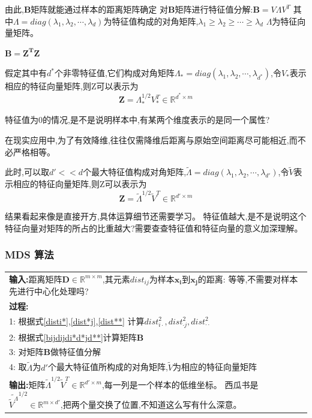 \documentclass[UTF8,a4paper]{ctexart}%
\begin{document}
              由此,$\mathbf{B}$矩阵就能通过样本的距离矩阵确定
              对$\mathbf{B}$矩阵进行特征值分解:$\mathbf{B} = V\Lambda V^T$
              其中$\Lambda = diag(\lambda_1,\lambda_2,\cdots,\lambda_d)$为特征值构成的对角矩阵,$\lambda_1\geqslant \lambda_2\geqslant\cdots\geqslant\lambda_d$
              $\Lambda$为特征向量矩阵。

              $\mathbf{\mathbf{B}} = \mathbf{Z^TZ}$

              假定其中有$d^*$个非零特征值,它们构成对角矩阵$\Lambda_* = diag(\lambda_1,\lambda_2,\cdots,\lambda_{d^*})$,令$V_*$表示相应的特征向量矩阵,则Z可以表示为
              \[ \mathbf{Z} =\Lambda_*^{1/2}V_*^T \in \mathbb{R}^{d^* \times m}  \]

              {
              \color{red} 特征值为0的情况,是不是说明样本中,有某两个维度表示的是同一个属性?
              }

              在现实应用中,为了有效降维,往往仅需降维后距离与原始空间距离尽可能相近,而不必严格相等。

              此时,可以取$d' << d$个最大特征值构成对角矩阵,$\tilde{\Lambda } = diag(\lambda_1,\lambda_2,\cdots,\lambda_{d'} )$,令$\tilde{V}$表示相应的特征向量矩阵,则Z可以表示为
                \[ \mathbf{Z} =\tilde{\Lambda}^{1/2}\tilde{V}^T \in \mathbb{R}^{d' \times m}  \]

                {\color{red}
                    结果看起来像是直接开方,具体运算细节还需要学习。
                }
                {\color{red}
                  特征值越大,是不是说明这个特征向量对矩阵的所占的比重越大?需要查查特征值和特征向量的意义加深理解。
                }

            \subsubsection{MDS 算法}
            \begin{tabular}{l}
              \hline
              \textbf{输入:}距离矩阵$\mathbf{D} \in \mathbb{R}^{m \times m}$,其元素$dist_{ij}$为样本$\mathbf{x_i}$到$\mathbf{x_j}$的距离:
              {\color{red}等等,不需要对样本先进行中心化处理吗?}\\
            \textbf{过程:}\\
              1: 根据式\eqref{disti*},\eqref{dist*j},\eqref{dist**} 计算$    dist^2_{i \cdot},  dist^2_{\cdot j},dist^2_{\cdot \cdot}$\\
              2: 根据式\eqref{bijdijdi*d*jd**}计算矩阵$\mathbf{B}$\\
              3: 对矩阵$\mathbf{B}$做特征值分解\\
              4: 取$\tilde{\Lambda}$为$d'$个最大特征值所构成的对角矩阵,$\tilde{V}$为相应的特征向量矩阵\\
              \textbf{输出:}矩阵$\tilde{\Lambda}^{1/2}\tilde{V}^T \in \mathbb{R}^{d' \times m}$,每一列是一个样本的低维坐标。{\color{red} 西瓜书是$\tilde{\tilde{V}^\Lambda}^{1/2} \in \mathbb{R}^{m \times d'}$,把两个量交换了位置,不知道这么写有什么深意。}\\
              \hline
            \end{tabular}
\end{document}
